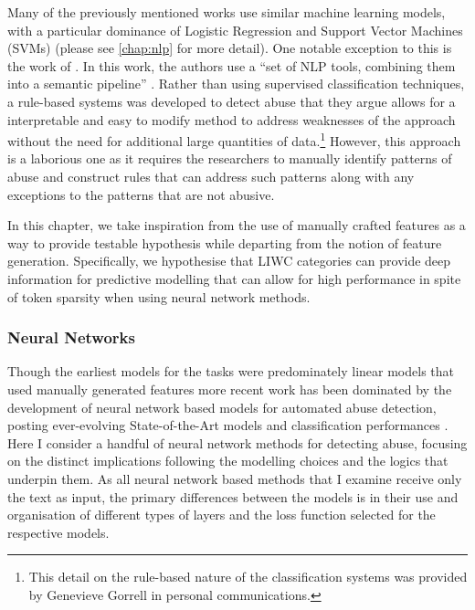 Many of the previously mentioned works use similar machine learning models, with a particular dominance of Logistic Regression and Support Vector Machines (SVMs) (please see \cref{chap:nlp} for more detail). One notable exception to this is the work of \citet{Gorrell:2018}. In this work, the authors use a ``set of NLP tools, combining them into a semantic pipeline'' \citep[pp. 601]{Gorrell:2018}. Rather than using supervised classification techniques, a rule-based systems was developed to detect abuse that they argue allows for a interpretable and easy to modify method to address weaknesses of the approach without the need for additional large quantities of data.\footnote{This detail on the rule-based nature of the classification systems was provided by Genevieve Gorrell in personal communications.} However, this approach is a laborious one as it requires the researchers to manually identify patterns of abuse and construct rules that can address such patterns along with any exceptions to the patterns that are not abusive.
\vspace{5mm}

In this chapter, we take inspiration from the use of manually crafted features as a way to provide testable hypothesis while departing from the notion of feature generation. Specifically, we hypothesise that LIWC categories can provide deep information for predictive modelling that can allow for high performance in spite of token sparsity when using neural network methods.

\subsubsection{Neural Networks}\label{sec:liwc_nn}
Though the earliest models for the tasks were predominately linear models that used manually generated features \citep{Waseem-Hovy:2016,Davidson:2017,Warner:2012} more recent work has been dominated by the development of neural network based models for automated abuse detection, posting ever-evolving State-of-the-Art models and classification performances \citep[e.g.]{Park:2017,Badjatiya:2017,Zimmerman:2018,Stoop:2019,Isaksen:2020}. Here I consider a handful of neural network methods for detecting abuse, focusing on the distinct implications following the modelling choices and the logics that underpin them. As all neural network based methods that I examine receive only the text as input, the primary differences between the models is in their use and organisation of different types of layers and the loss function selected for the respective models.

